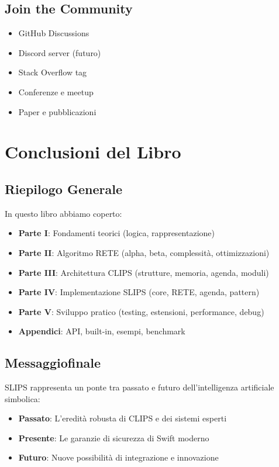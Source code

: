 \subsection{Join the Community}

\begin{itemize}
\item GitHub Discussions
\item Discord server (futuro)
\item Stack Overflow tag
\item Conferenze e meetup
\item Paper e pubblicazioni
\end{itemize}

\section{Conclusioni del Libro}

\subsection{Riepilogo Generale}

In questo libro abbiamo coperto:

\begin{itemize}
\item \textbf{Parte I}: Fondamenti teorici (logica, rappresentazione)
\item \textbf{Parte II}: Algoritmo RETE (alpha, beta, complessità, ottimizzazioni)
\item \textbf{Parte III}: Architettura CLIPS (strutture, memoria, agenda, moduli)
\item \textbf{Parte IV}: Implementazione SLIPS (core, RETE, agenda, pattern)
\item \textbf{Parte V}: Sviluppo pratico (testing, estensioni, performance, debug)
\item \textbf{Appendici}: API, built-in, esempi, benchmark
\end{itemize}

\subsection{Messaggiofinale}

SLIPS rappresenta un ponte tra passato e futuro dell'intelligenza artificiale simbolica:

\begin{itemize}
\item \textbf{Passato}: L'eredità robusta di CLIPS e dei sistemi esperti
\item \textbf{Presente}: Le garanzie di sicurezza di Swift moderno
\item \textbf{Futuro}: Nuove possibilità di integrazione e innovazione
\end{itemize}

